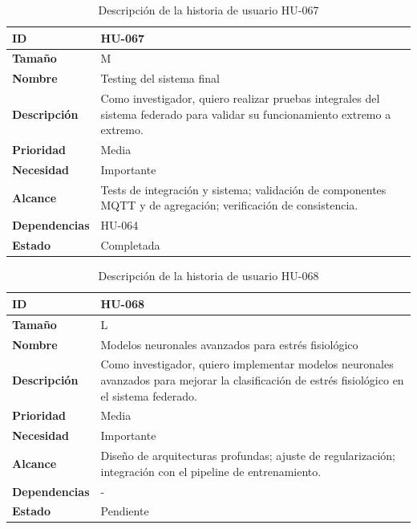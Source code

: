 \documentclass{report}
\begin{document}
\begin{table}[H]
\centering
\caption{Descripción de la historia de usuario HU-067}
\label{tab:hu067}
\begin{tabular}{|l|p{12cm}|}
\hline
\textbf{ID} & HU-067 \\ \hline
\textbf{Tamaño} & M \\ \hline
\textbf{Nombre} & Testing del sistema final \\ \hline
\textbf{Descripción} &
Como investigador, quiero realizar pruebas integrales del sistema federado para validar su funcionamiento extremo a extremo. \\ \hline
\textbf{Prioridad} & Media \\ \hline
\textbf{Necesidad} & Importante \\ \hline
\textbf{Alcance} &
Tests de integración y sistema; validación de componentes MQTT y de agregación; verificación de consistencia. \\ \hline
\textbf{Dependencias} & HU-064 \\ \hline
\textbf{Estado} & Completada \\ \hline
\end{tabular}
\end{table}


\begin{table}[H]
\centering
\caption{Descripción de la historia de usuario HU-068}
\label{tab:hu068}
\begin{tabular}{|l|p{12cm}|}
\hline
\textbf{ID} & HU-068 \\ \hline
\textbf{Tamaño} & L \\ \hline
\textbf{Nombre} & Modelos neuronales avanzados para estrés fisiológico \\ \hline
\textbf{Descripción} &
Como investigador, quiero implementar modelos neuronales avanzados para mejorar la clasificación de estrés fisiológico en el sistema federado. \\ \hline
\textbf{Prioridad} & Media \\ \hline
\textbf{Necesidad} & Importante \\ \hline
\textbf{Alcance} &
Diseño de arquitecturas profundas; ajuste de regularización; integración con el pipeline de entrenamiento. \\ \hline
\textbf{Dependencias} & - \\ \hline
\textbf{Estado} & Pendiente \\ \hline
\end{tabular}
\end{table}
\end{document}
